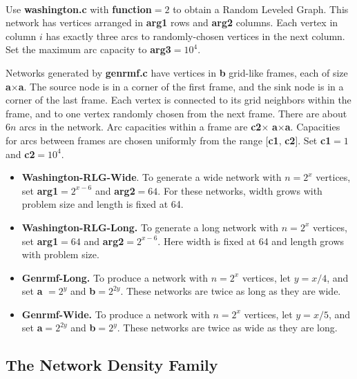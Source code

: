 \paragraph{ } 

Use {\bf washington.c} with {\bf function}$=2$ to obtain a Random
Leveled Graph.  This network has vertices arranged in {\bf arg1} rows
and {\bf arg2} columns.  Each vertex in column $i$ has exactly three
arcs to randomly-chosen vertices in the next column.  Set the maximum
arc capacity to {\bf arg3}$=10^4$.

Networks generated by {\bf genrmf.c} have vertices in {\bf b}
grid-like frames, each of size {\bf a}$\times${\bf a}.  The source
node is in a corner of the first frame, and the sink node is in a
corner of the last frame.  Each vertex is connected to its grid
neighbors within the frame, and to one vertex randomly chosen from the
next frame.  There are about $6n$ arcs in the network. 
Arc capacities within a frame are {\bf c2}$\times${\bf
a}$\times${\bf a}.  Capacities for arcs between frames are chosen
uniformly from the range [{\bf c1}, {\bf c2}]. Set {\bf c1}$=1$ and
{\bf c2}$=10^4$.  

\begin{itemize}   
\item {\bf Washington-RLG-Wide}. 
To generate a wide network with $n = 2^x$ vertices, set {\bf
arg1}$=2^{x-6}$ and {\bf arg2}$=64$.  For these networks, width grows
with problem size and length is fixed at 64.

\item {\bf Washington-RLG-Long.}  To generate a long network with $n=2^x$ 
vertices, set {\bf arg1}$=64$ and {\bf arg2}$=2^{x-6}$.  Here width is
fixed at 64 and length grows with problem size.

\item {\bf Genrmf-Long.} 
To produce a network with $n= 2^{x}$ vertices, let $y = x/4$, and set
{\bf a} $= 2^{y}$ and {\bf b}$ = 2^{2y}$.  These networks are twice as
long as they are wide.

\item {\bf Genrmf-Wide.}  To produce a network with $n=2^x$ vertices, 
let $y = x/5$, and set {\bf a}$ = 2^{2y}$ and {\bf b}$ = 2^{y}$.
These networks are twice as wide as they are long.
\end{itemize} 

\subsection{The Network Density Family} 

